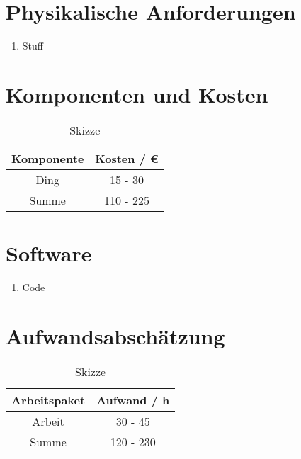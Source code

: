 \section*{Physikalische Anforderungen}
\begin{enumerate}
    \item Stuff
\end{enumerate}


\section*{Komponenten und Kosten}
\begin{table}[H]
    \centering
    \caption{
        Skizze
    }
    \begin{tabular}{| c | c |}
        \hline
        Komponente &  Kosten / \euro{}\\
        \hline
        Ding & 15 - 30  \\
        \hline
        \hline
        Summe & 110 - 225  \\
        \hline
    \end{tabular}
    \label{tab:Komponenten}
\end{table}


\section*{Software}
\begin{enumerate}
    \item Code
\end{enumerate}

\section*{Aufwandsabschätzung}
\begin{table}[H]
    \centering
    \caption{
        Skizze
    }
    \begin{tabular}{| c | c |}
        \hline
        Arbeitspaket &  Aufwand / h\\
        \hline
        Arbeit & 30 - 45  \\
        \hline
        \hline
        Summe & 120 - 230  \\
        \hline
    \end{tabular}
    \label{tab:Aufwand}
\end{table}